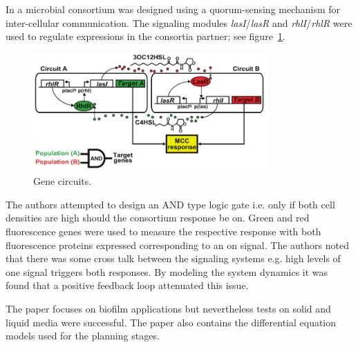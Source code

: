 \documentclass[float=false, crop=false]{standalone}
\begin{document}
	
	In \cite{Brenner2007} a microbial consortium was designed using a quorum-sensing mechanism for inter-cellular communication. The signaling modules \textit{lasI}/\textit{lasR} and \textit{rhlI}/\textit{rhlR} were used to regulate expressions in the consortia partner; see figure~\ref{fig:brenner2007_genecircuits}.
	
	\begin{figure}[h]
		\centering
		\includegraphics[width=0.8\textwidth]{brenner2007_genecircuits.png}
		\caption{Gene circuits.}
		\label{fig:brenner2007_genecircuits}
	\end{figure}	
	The authors attempted to design an AND type logic gate i.e. only if both cell densities are high should the consortium response be on. Green and red fluorescence genes were used to measure the respective response with both fluorescence proteins expressed corresponding to an on signal. The authors noted that there was some cross talk between the signaling systems e.g. high levels of one signal triggers both responses. By modeling the system dynamics it was found that a positive feedback loop attenuated this issue.
	
	The paper focuses on biofilm applications but nevertheless tests on solid and liquid media were successful. The paper also contains the differential equation models used for the planning stages.
	
	
	\ifstandalone
			
		
	\fi
\end{document}
